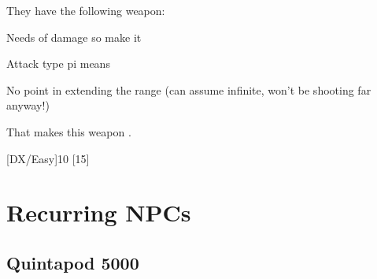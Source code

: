 They have the following weapon:
\begin{innateattack}
  \item Needs  of damage so make it 
  \item Attack type pi means 
  \item No point in extending the range (can assume infinite, won't be shooting
    far anyway!)
  \item That makes this weapon \InnateAttackTotalPoints.
\end{innateattack}

\begin{character}
  [DX/Easy]{10}
  [15]
\end{character}


\chapter{Recurring NPCs}
\label{cha:recurring-npcs}

\section{Quintapod 5000}
\label{sec:quintapod-5000}





